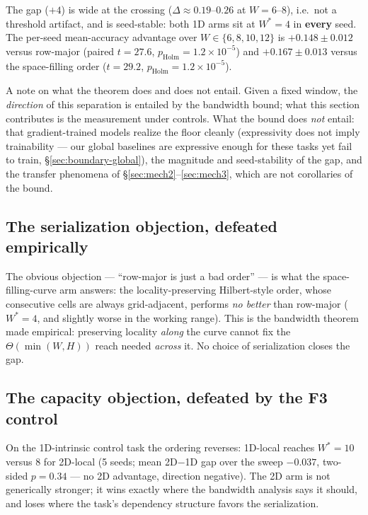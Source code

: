 \documentclass[11pt]{article}
\newcommand{\Wstar}{W^{*}}
\newcommand{\pholm}{p_{\mathrm{Holm}}}
\begin{document}
The gap ($+4$) is wide at the crossing ($\Delta \approx 0.19$--$0.26$ at
$W = 6$--$8$), i.e.\ not a threshold artifact, and is seed-stable: both 1D
arms sit at $\Wstar = 4$ in \textbf{every} seed. The per-seed mean-accuracy
advantage over $W \in \{6,8,10,12\}$ is $+0.148 \pm 0.012$ versus row-major
(paired $t = 27.6$, $\pholm = 1.2\times10^{-5}$) and $+0.167 \pm 0.013$
versus the space-filling order ($t = 29.2$, $\pholm = 1.2\times10^{-5}$).

A note on what the theorem does and does not entail. Given a fixed window,
the \emph{direction} of this separation is entailed by the bandwidth bound;
what this section contributes is the measurement under controls. What the
bound does \emph{not} entail: that gradient-trained models
realize the floor cleanly (expressivity does not imply trainability --- our
global baselines are expressive enough for these tasks yet fail to train,
\S\ref{sec:boundary-global}), the magnitude and seed-stability of the gap,
and the transfer phenomena of \S\ref{sec:mech2}--\ref{sec:mech3}, which are
not corollaries of the bound.

\subsection{The serialization objection, defeated empirically}\label{sec:serialization}

The obvious objection --- ``row-major is just a bad order'' --- is what the
space-filling-curve arm answers: the locality-preserving Hilbert-style order,
whose consecutive cells are always grid-adjacent, performs \emph{no better}
than row-major ($\Wstar = 4$, and slightly worse in the working range). This
is the bandwidth theorem made empirical: preserving locality \emph{along} the
curve cannot fix the $\Theta(\min(W,H))$ reach needed \emph{across} it. No
choice of serialization closes the gap.

\subsection{The capacity objection, defeated by the F3 control}\label{sec:capacity}

On the 1D-intrinsic control task the ordering reverses: 1D-local reaches
$\Wstar = 10$ versus 8 for 2D-local (5 seeds; mean 2D$-$1D gap over the sweep
$\mathbf{-0.037}$, two-sided $p = 0.34$ --- no 2D advantage, direction
negative). The 2D arm is not generically stronger; it wins exactly where the
bandwidth analysis says it should, and loses where the task's dependency
structure favors the serialization.
\end{document}

